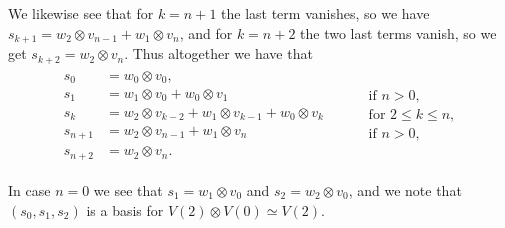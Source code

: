 We likewise see that for $k=n+1$ the last term vanishes, so we have $s_{k+1}=w_2\otimes v_{n-1}+ w_1\otimes v_n$, and for $k=n+2$ the two last terms vanish, so we get $s_{k+2}=w_2\otimes v_n$. Thus altogether we have that
\begin{align}
  \begin{aligned}
    s_0 &= w_0\otimes v_0, \\
    s_1 &= w_1\otimes v_0 + w_0\otimes v_1 \\
    s_k &= w_2\otimes v_{k-2} + w_1\otimes v_{k-1} + w_0\otimes v_k \\
    s_{n+1} &= w_2\otimes v_{n-1} + w_1\otimes v_n \\
    s_{n+2} &= w_2\otimes v_n.
  \end{aligned} &&
                   \begin{aligned}
                     &\phantom{a}\\ &\mbox{if }n>0, \\ &\mbox{for }2\leq k\leq n, \\ &\mbox{if }n>0,\\ &\phantom{a}
                   \end{aligned}
\end{align}

In case $n=0$ we see that $s_1=w_1\otimes v_0$ and $s_2=w_2\otimes v_0$, and we note that $(s_0,s_1,s_2)$ is a basis for $V(2)\otimes V(0)\simeq V(2)$.

